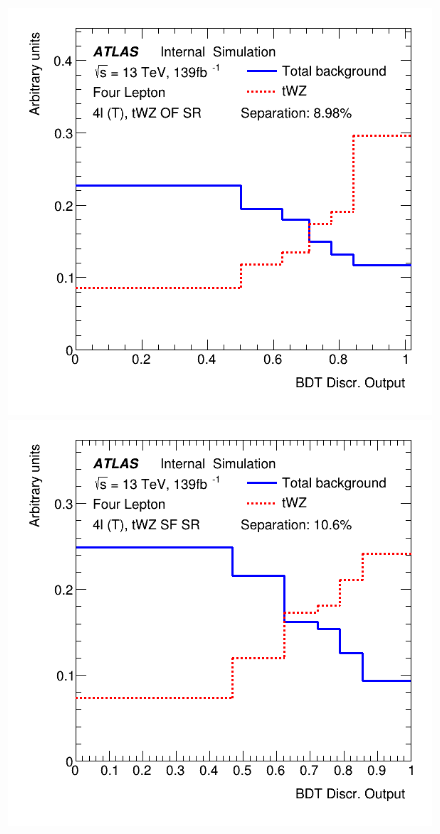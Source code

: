 \begin{figure}[h!]
	\includegraphics[scale=0.27]{figures/lep4_tWZ_4T_OF.png}
	\includegraphics[scale=0.27]{figures/lep4_tWZ_4T_SF.png}

\end{figure}
